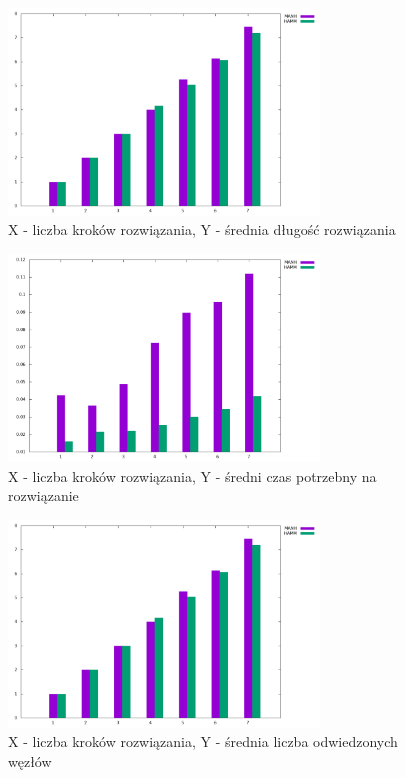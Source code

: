 \documentclass{classrep}
\begin{document}
{{            \begin{figure}[!htbp]
                \centering
                \includegraphics[width=\textwidth, height=55mm]{img/ASTR_length.png}
                \caption{X - liczba kroków rozwiązania, Y - średnia długość rozwiązania}
                \label{ASTR_length}
            \end{figure}

            \begin{figure}[!htbp]
                \centering
                \includegraphics[width=\textwidth, height=55mm]{img/ASTR_time.png}
                \caption{X - liczba kroków rozwiązania, Y - średni czas potrzebny na rozwiązanie}
                \label{ASTR_time}
            \end{figure}

            \begin{figure}[!htbp]
                \centering
                \includegraphics[width=\textwidth, height=55mm]{img/ASTR_visited.png}
                \caption{X - liczba kroków rozwiązania, Y - średnia liczba odwiedzonych węzłów}
                \label{ASTR_visited}
            \end{figure}
            \FloatBarrier
        }

}
\end{document}
